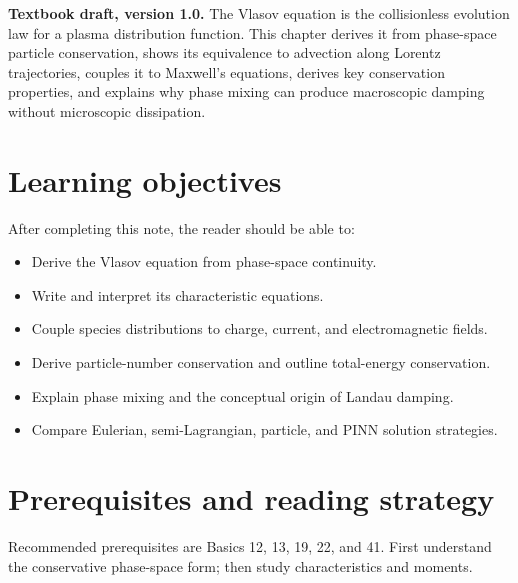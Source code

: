 \documentclass[11pt]{article}
\begin{document}

\begin{overviewbox}
\textbf{Textbook draft, version 1.0.} The Vlasov equation is the collisionless evolution law for a plasma distribution function. This chapter derives it from phase-space particle conservation, shows its equivalence to advection along Lorentz trajectories, couples it to Maxwell's equations, derives key conservation properties, and explains why phase mixing can produce macroscopic damping without microscopic dissipation.
\end{overviewbox}

\ProjectTOC

\section{Learning objectives}
After completing this note, the reader should be able to:
\begin{itemize}[leftmargin=1.6em]
\item Derive the Vlasov equation from phase-space continuity.
\item Write and interpret its characteristic equations.
\item Couple species distributions to charge, current, and electromagnetic fields.
\item Derive particle-number conservation and outline total-energy conservation.
\item Explain phase mixing and the conceptual origin of Landau damping.
\item Compare Eulerian, semi-Lagrangian, particle, and PINN solution strategies.
\end{itemize}

\section{Prerequisites and reading strategy}
Recommended prerequisites are Basics 12, 13, 19, 22, and 41. First understand the conservative phase-space form; then study characteristics and moments.
\end{document}
